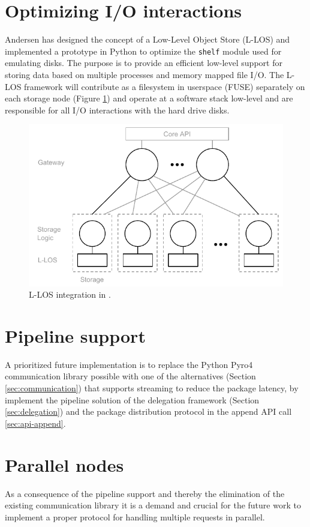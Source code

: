 \section{Optimizing I/O interactions}
Andersen has designed the concept of a Low-Level Object Store (L-LOS) and implemented a prototype in Python\cite{andersen2016} to optimize the \texttt{shelf} module used for emulating disks. The purpose is to provide an efficient low-level support for storing data based on multiple processes and memory mapped file I/O. The L-LOS framework will contribute as a filesystem in userspace (FUSE) separately on each storage node (Figure \ref{fig:sofa-llos-extension}) and operate at a software stack low-level and are responsible for all I/O interactions with the hard drive disks.

\begin{figure}
	\centering
	\includegraphics[scale=0.95]{pdf/sofa-llos-extension.pdf}
	\caption{L-LOS integration in \CodeName. \label{fig:sofa-llos-extension}}
\end{figure}

\section{Pipeline support}
A prioritized future implementation is to replace the Python Pyro4 communication library possible with one of the alternatives (Section \ref{sec:communication}) that supports streaming to reduce the package latency, by implement the pipeline solution of the delegation framework (Section \ref{sec:delegation}) and the package distribution protocol in the append API call \ref{sec:api-append}.

\section{Parallel nodes}
As a consequence of the pipeline support and thereby the elimination of the existing communication library it is a demand and crucial for the future work to implement a proper protocol for handling multiple requests in parallel.

